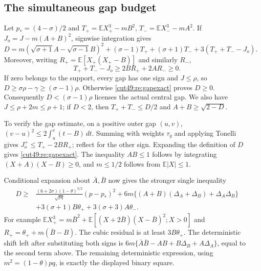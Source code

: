 \documentclass[11pt,a4paper]{article}
\numberwithin{equation}{section}
\theoremstyle{definition}
\theoremstyle{remark}
\newcommand{\E}{\mathbb E}
\begin{document}
\subsection{The simultaneous gap budget}
Let $p_*=(4-\sigma)/2$ and
$T_+=\E X_+^3-mB^2$, $T_-=\E X_-^3-mA^2$.
If $J_o=J-m(A+B)^2$, signwise integration gives
\begin{equation}\label{cut49:re:gapexact}
 D=m(\sqrt{\sigma+1}A-\sqrt{\sigma-1}B)^2
   +(\sigma-1)T_++(\sigma+1)T_-+3(T_++T_--J_o).
\end{equation}
Moreover, writing $R_+=\E[X_+(X_+-B)]$ and similarly $R_-$,
\[
 T_++T_--J_o\ge2BR_++2AR_-\ge0.
\]
If zero belongs to the support, every gap has one sign and $J\le\rho$,
so $D\ge\sigma\rho-\gamma\ge(\sigma-1)\rho$.
Otherwise \eqref{cut49:re:gapexact} proves $D\ge0$.
Consequently $D<(\sigma-1)\rho$ licenses the actual central gap.
We also have $J\le\rho+2m\le\rho+1$; if $D<2$, then
$T_++T_-\le D/2$ and $A+B\ge\sqrt{2-D}$.

To verify the gap estimate, on a positive outer gap $(u,v)$,
$(v-u)^2\le2\int_u^v(t-B)\,dt$.
Summing with weights $\tau_g$ and applying Tonelli gives
$J_o^+\le T_+-2BR_+$; reflect for the other sign.
Expanding the definition of $D$ gives \eqref{cut49:re:gapexact}.
The inequality $AB\le1$ follows by integrating $(X+A)(X-B)\ge0$,
and $m\le1/2$ follows from $\E|X|\le1$.

Conditional expansion about $\bar A,\bar B$ now gives the stronger
single inequality
\begin{equation}\label{cut49:re:joint}
\begin{split}
 D\ge{}&\frac{(6+2\sigma)(1-\theta)^{3/2}}{\sqrt{pq}}(p-p_*)^2
 +6m\{(A+B)(\Delta_A+\Delta_B)+\Delta_A\Delta_B\}\\
 &+3(\sigma+1)B\theta_++3(\sigma+3)A\theta_-.
\end{split}
\end{equation}
For example
$\E X_+^3=m\bar B^2+\E[(X+2\bar B)(X-\bar B)^2;X>0]$
and $R_+=\theta_++m(\bar B-B)$.
The cubic residual is at least $3B\theta_+$.
The deterministic shift left after substituting both signs is
$6m\{\bar A\bar B-AB+B\Delta_B+A\Delta_A\}$, equal to the
second term above. The remaining deterministic expression, using
$m^2=(1-\theta)pq$, is exactly the displayed binary square.
\end{document}
